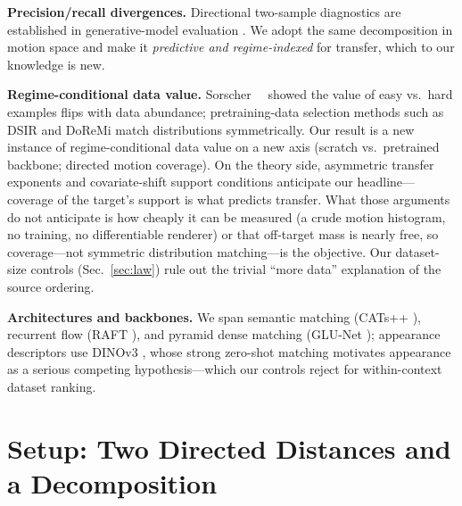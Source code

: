 \documentclass[runningheads]{llncs}
\begin{document}
\noindent\textbf{Precision/recall divergences.}
Directional two-sample diagnostics are established in generative-model
evaluation \cite{sajjadi2018assessing_precision_recall,
kynkaanniemi2019improved_pr,naeem2020reliable,alaa2022faithful}. We adopt the
same decomposition in motion space and make it \emph{predictive and
regime-indexed} for transfer, which to our knowledge is new.

\noindent\textbf{Regime-conditional data value.}
Sorscher~\etal~\cite{sorscher2022beyond} showed the value of easy vs.\ hard
examples flips with data abundance; pretraining-data selection methods such
as DSIR \cite{xie2023data} and DoReMi \cite{xie2023doremi} match
distributions symmetrically. Our result is a new instance of
regime-conditional data value on a new axis (scratch vs.\ pretrained backbone;
directed motion coverage). On the theory side, asymmetric transfer exponents
\cite{hanneke2019value} and covariate-shift support conditions anticipate
our headline---coverage of the target's support is what predicts
transfer. What those arguments do not anticipate is how cheaply it can be
measured (a crude motion histogram, no training, no differentiable renderer) or
that off-target mass is nearly free, so coverage---not symmetric distribution
matching---is the objective. Our dataset-size controls (Sec.~\ref{sec:law}) rule
out the trivial ``more data'' explanation of the source ordering.

\noindent\textbf{Architectures and backbones.}
We span semantic matching (CATs++ \cite{cho2022cats++}), recurrent flow (RAFT
\cite{teed2020raft}), and pyramid dense matching (GLU-Net
\cite{truong2020glunet}); appearance descriptors use DINOv3
\cite{simeoni2025dinov3}, whose strong zero-shot matching
\cite{sd_dino_tale_of_two_features} motivates appearance as a serious
competing hypothesis---which our controls reject for within-context dataset
ranking.

\section{Setup: Two Directed Distances and a Decomposition}
\label{sec:setup}
\end{document}
